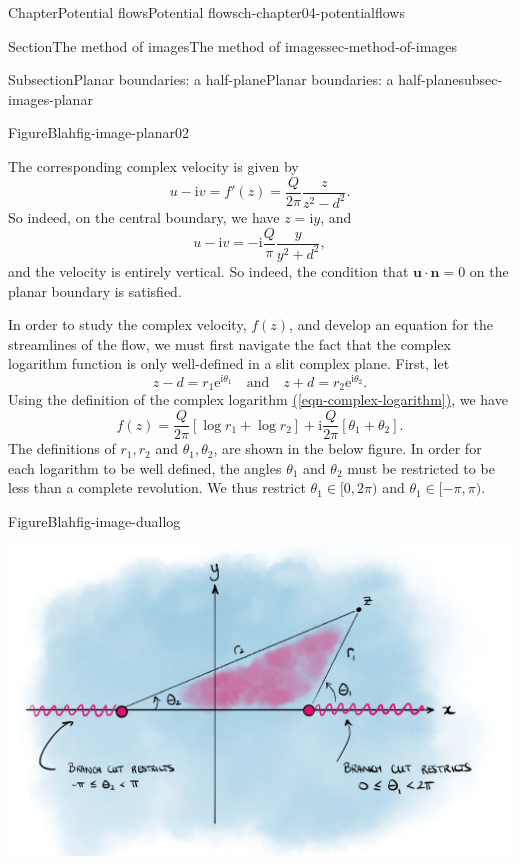 \documentclass[oneside,10pt,]{book}
\newcommand{\xreffont}{\relax}
\numberwithin{equation}{section}
\newcommand{\e}{\mathrm{e}}
\newcommand{\im}{\mathrm{i}}
\newcommand{\bn}{\boldsymbol{n}}
\newcommand{\bu}{\boldsymbol{u}}
\begin{document}
\begin{chapterptx}{Chapter}{Potential flows}{}{Potential flows}{}{}{ch-chapter04-potentialflows}
\begin{sectionptx}{Section}{The method of images}{}{The method of images}{}{}{sec-method-of-images}
\begin{subsectionptx}{Subsection}{Planar boundaries: a half-plane}{}{Planar boundaries: a half-plane}{}{}{subsec-images-planar}
\begin{figureptx}{Figure}{Blah}{fig-image-planar02}{}
\begin{image}{0.1}{0.8}{0.1}{}
\end{image}%
\tcblower
\end{figureptx}%
The corresponding complex velocity is given by%
\begin{equation*}
u - \im v = f'(z) = \frac{Q}{2\pi}\frac{z}{z^2 - d^2}.
\end{equation*}
So indeed, on the central boundary, we have \(z = \im y\), and%
\begin{equation*}
u - \im v = - \im \frac{Q}{\pi} \frac{y}{y^2 + d^2},
\end{equation*}
and the velocity is entirely vertical. So indeed, the condition that \(\bu \cdot \bn = 0\) on the planar boundary is satisfied.%
\par
In order to study the complex velocity, \(f(z)\), and develop an equation for the streamlines of the flow, we must first navigate the fact that the complex logarithm function is only well-defined in a slit complex plane. First, let%
\begin{equation*}
z - d = r_1 \e^{\im \theta_1} \quad \textrm{and} \quad z + d = r_2 \e^{\im \theta_2}.
\end{equation*}
Using the definition of the complex logarithm \hyperref[eqn-complex-logarithm]{({\xreffont\ref{eqn-complex-logarithm}})}, we have%
\begin{equation*}
f(z) = \frac{Q}{2\pi} \left[ \log r_1 + \log r_2\right] + \im \frac{Q}{2\pi}\left[ \theta_1 + \theta_2 \right].
\end{equation*}
The definitions of \(r_1, r_2\) and \(\theta_1, \theta_2\), are shown in the below figure. In order for each logarithm to be well defined, the angles \(\theta_1\) and \(\theta_2\) must be restricted to be less than a complete revolution. We thus restrict \(\theta_1 \in [0, 2\pi)\) and \(\theta_1 \in [-\pi, \pi)\).%
\begin{figureptx}{Figure}{Blah}{fig-image-duallog}{}%
\begin{image}{0}{1}{0}{}%
\includegraphics[width=\linewidth]{external/image-duallog.jpg}

\end{image}
\end{figureptx}
\end{subsectionptx}
\end{sectionptx}
\end{chapterptx}
\end{document}
